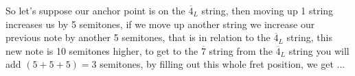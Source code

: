 \documentclass[preview]{standalone}
\begin{document}
\begin{center}
So let's suppose our anchor point is on the $\overline{4}_L$ string, then moving up 1 string increases us by 5 semitones, if we move up another string we increase our previous note by another 5 semitones, that is in relation to the $\overline{4}_L$ string, this new note is 10 semitones higher, to get to the $\overline{7}$ string from the $\overline{4}_L$ string you will add $(5 + 5 + 5) = 3$ semitones, by filling out this whole fret position, we get ...
\end{center}
\end{document}
